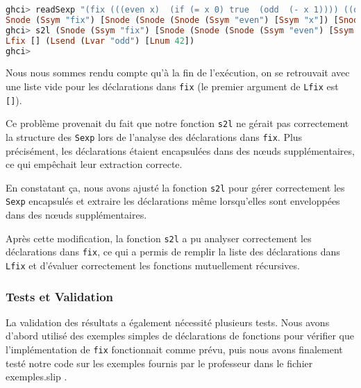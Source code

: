 \documentclass[a4paper,12pt]{article}
\begin{document}
\begin{lstlisting}[language=Haskell, caption={Erreur rencontrée lors de l'utilisation de \texttt{fix}}, label={lst:fixError}]
ghci> readSexp "(fix (((even x)  (if (= x 0) true  (odd  (- x 1)))) ((odd x)   (if (= x 0) false (even (- x 1))))) (odd 42))"
Snode (Ssym "fix") [Snode (Snode (Snode (Ssym "even") [Ssym "x"]) [Snode (Ssym "if") [Snode (Ssym "=") [Ssym "x",Snum 0],Ssym "true",Snode (Ssym "odd") [Snode (Ssym "-") [Ssym "x",Snum 1]]]]) [Snode (Snode (Ssym "odd") [Ssym "x"]) [Snode (Ssym "if") [Snode (Ssym "=") [Ssym "x",Snum 0],Ssym "false",Snode (Ssym "even") [Snode (Ssym "-") [Ssym "x",Snum 1]]]]],Snode (Ssym "odd") [Snum 42]]
ghci> s2l (Snode (Ssym "fix") [Snode (Snode (Snode (Ssym "even") [Ssym "x"]) [Snode (Ssym "if") [Snode (Ssym "=") [Ssym "x",Snum 0],Ssym "true",Snode (Ssym "odd") [Snode (Ssym "-") [Ssym "x",Snum 1]]]]) [Snode (Snode (Ssym "odd") [Ssym "x"]) [Snode (Ssym "if") [Snode (Ssym "=") [Ssym "x",Snum 0],Ssym "false",Snode (Ssym "even") [Snode (Ssym "-") [Ssym "x",Snum 1]]]]],Snode (Ssym "odd") [Snum 42]])
Lfix [] (Lsend (Lvar "odd") [Lnum 42])
ghci>
\end{lstlisting}

Nous nous sommes rendu compte qu'à la fin de l'exécution, on se retrouvait avec une liste vide pour les déclarations dans \texttt{fix} (le premier argument de \texttt{Lfix} est \texttt{[]}).

Ce problème provenait du fait que notre fonction \texttt{s2l} ne gérait pas correctement la structure des \texttt{Sexp} lors de l'analyse des déclarations dans \texttt{fix}. Plus précisément, les déclarations étaient encapsulées dans des nœuds supplémentaires, ce qui empêchait leur extraction correcte.

En constatant ça, nous avons ajusté la fonction \texttt{s2l} pour gérer correctement les \texttt{Sexp} encapsulés et extraire les déclarations même lorsqu'elles sont enveloppées dans des nœuds supplémentaires.

Après cette modification, la fonction \texttt{s2l} a pu analyser correctement les déclarations dans \texttt{fix}, ce qui a permis de remplir la liste des déclarations dans \texttt{Lfix} et d'évaluer correctement les fonctions mutuellement récursives.


\subsubsection{Tests et Validation}

La validation des résultats a également nécessité plusieurs tests. Nous avons d'abord utilisé des exemples simples de déclarations de fonctions pour vérifier que l'implémentation de \texttt{fix} fonctionnait comme prévu, puis nous avons finalement testé notre code sur les exemples fournis par le professeur dans le fichier exemples.slip . 
\end{document}
